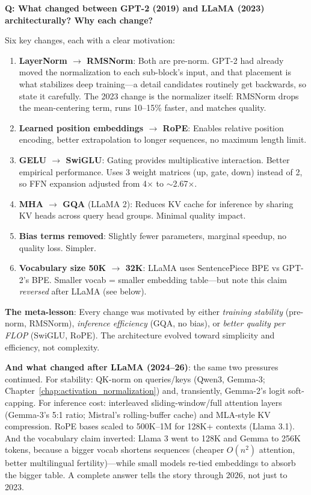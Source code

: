 \begin{interviewq}
\textbf{Q: What changed between GPT-2 (2019) and LLaMA (2023) architecturally? Why each change?}

 \quad {} \quad \badgefreq{\freqhigh}

\stronganswer

Six key changes, each with a clear motivation:

\begin{enumerate}
    \item \textbf{LayerNorm $\to$ RMSNorm}: Both are pre-norm. GPT-2 had already moved the
    normalization to each sub-block's input, and that placement is what stabilizes deep
    training---a detail candidates routinely get backwards, so state it carefully. The 2023
    change is the normalizer itself: RMSNorm drops the mean-centering term, runs 10--15\%
    faster, and matches quality.
    \item \textbf{Learned position embeddings $\to$ RoPE}: Enables relative position encoding, better extrapolation to longer sequences, no maximum length limit.
    \item \textbf{GELU $\to$ SwiGLU}: Gating provides multiplicative interaction. Better empirical performance. Uses 3 weight matrices (up, gate, down) instead of 2, so FFN expansion adjusted from 4$\times$ to $\sim$2.67$\times$.
    \item \textbf{MHA $\to$ GQA} (LLaMA 2): Reduces KV cache for inference by sharing KV heads across query head groups. Minimal quality impact.
    \item \textbf{Bias terms removed}: Slightly fewer parameters, marginal speedup, no quality loss. Simpler.
    \item \textbf{Vocabulary size 50K $\to$ 32K}: LLaMA uses SentencePiece BPE vs GPT-2's BPE. Smaller vocab = smaller embedding table---but note this claim \textit{reversed} after LLaMA (see below).
\end{enumerate}

\textbf{The meta-lesson}: Every change was motivated by either \textit{training stability} (pre-norm, RMSNorm), \textit{inference efficiency} (GQA, no bias), or \textit{better quality per FLOP} (SwiGLU, RoPE). The architecture evolved toward simplicity and efficiency, not complexity.

\textbf{And what changed after LLaMA (2024--26)}: the same two pressures continued. For stability: QK-norm on queries/keys (Qwen3, Gemma-3; Chapter~\ref{chap:activation_normalization}) and, transiently, Gemma-2's logit soft-capping. For inference cost: interleaved sliding-window/full attention layers (Gemma-3's 5:1 ratio; Mistral's rolling-buffer cache) and MLA-style KV compression. RoPE bases scaled to 500K--1M for 128K+ contexts (Llama 3.1). And the vocabulary claim inverted: Llama 3 went to 128K and Gemma to 256K tokens, because a bigger vocab shortens sequences (cheaper $O(n^2)$ attention, better multilingual fertility)---while small models re-tied embeddings to absorb the bigger table. A complete answer tells the story through 2026, not just to 2023.


\end{interviewq}

